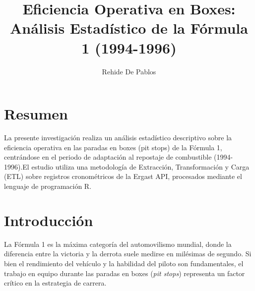 \documentclass[oneside,11pt]{Latex/Classes/PhDthesisPSnPDF}
\title{Eficiencia Operativa en Boxes: Análisis Estadístico de la Fórmula
1 (1994-1996)}
\author{Rehide De Pablos}
\begin{document}
\maketitle

\frontmatter


\setcounter{secnumdepth}{3}
\setcounter{tocdepth}{3}

\tableofcontents



\cleardoublepage

  \cleardoublepage       %
  \chapter*{Resumen}     %
  
  La presente investigación realiza un análisis estadístico descriptivo
sobre la eficiencia operativa en las paradas en boxes (pit stops) de la
Fórmula 1, centrándose en el periodo de adaptación al repostaje de
combustible (1994-1996).El estudio utiliza una metodología de
Extracción, Transformación y Carga (ETL) sobre registros cronométricos
de la Ergast API, procesados mediante el lenguaje de programación
R.             %
  
  \cleardoublepage

\mainmatter
\def\baselinestretch{1.5}

\chapter*{Introducción}

La Fórmula 1 es la máxima categoría del automovilismo mundial, donde la
diferencia entre la victoria y la derrota suele medirse en milésimas de
segundo. Si bien el rendimiento del vehículo y la habilidad del piloto
son fundamentales, el trabajo en equipo durante las paradas en boxes
(\emph{pit stops}) representa un factor crítico en la estrategia de
carrera.
\end{document}
